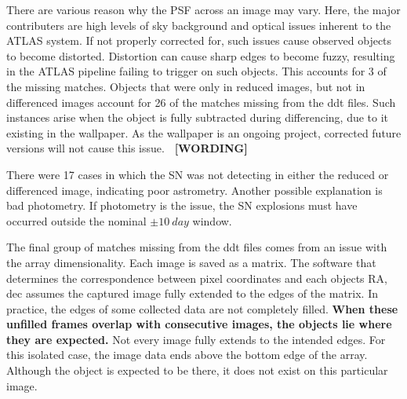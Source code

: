 \documentclass[aps,prb,twocolumn,superscriptaddress]{revtex4-1}
\begin{document}
\indent There are various reason why the PSF across an image may vary.
Here, the major contributers are high levels of sky background and optical 
issues inherent to the ATLAS system. 
If not properly corrected for, such issues cause observed objects to become distorted. 
Distortion can cause sharp edges to become fuzzy, resulting in the ATLAS pipeline 
failing to trigger on such objects. This accounts for 3 of the missing matches.
Objects that were only in reduced images, but not in differenced images account 
for 26 of the matches missing from the ddt files. Such instances arise when the 
object is fully subtracted during differencing, due to it existing in the wallpaper.
As the wallpaper is an ongoing project, corrected future versions will not cause this issue.
{\bf ~[WORDING]}


\indent There were 17 cases in which the SN was not detecting in either the reduced or 
differenced image, indicating poor astrometry. Another possible explanation is 
bad photometry. If photometry is the issue, the SN explosions must have occurred 
outside the nominal $\pm10~day$ window.


\indent The final group of matches missing from the ddt files comes from an issue with 
the array dimensionality. Each image is saved as a matrix. The software that 
determines the correspondence between pixel coordinates and each objects RA, dec 
assumes the captured image fully extended to the edges of the matrix.
In practice, the edges of some collected data are not completely filled. 
{\bf When these unfilled frames overlap with consecutive images, the objects lie where they are expected.} 
Not every image fully extends to the intended edges. 
For this isolated case, the 
image data ends above the bottom edge of the array. Although the object is expected 
to be there, it does not exist on this particular image.
\end{document}
